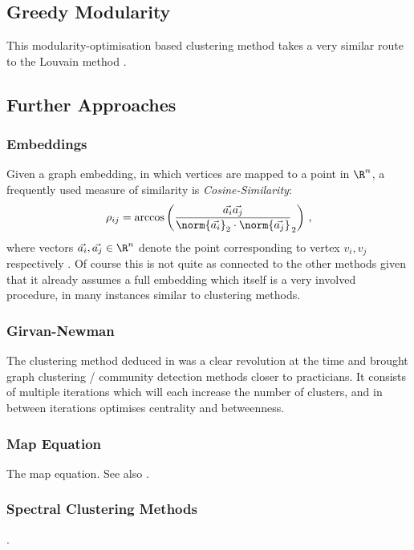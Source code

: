 \documentclass[12pt, a4paper]{article}
\begin{document}
  \subsection{Greedy Modularity}
  This modularity-optimisation based clustering method takes a very similar route to the Louvain method \cite{clauset-greedy-modularity}.

  \subsection{Further Approaches}
  \subsubsection{Embeddings}
  Given a graph embedding, in which vertices are mapped to a point in $\R^n$, a frequently used measure of similarity is \textit{Cosine-Similarity}:
  $$\rho_{ij} = \arccos\left(\frac{\vec{a_i} \vec{a_j}}{\norm{\vec{a_i}}_2 \cdot \norm{\vec{a_j}}}_2\right)\,,$$
  where vectors $\vec{a_i}, \vec{a_j} \in \R^n$ denote the point corresponding to vertex $v_i, v_j$ respectively \parencite{fortunato}.
  Of course this is not quite as connected to the other methods given that it already assumes a full embedding which itself is a very involved procedure, in many instances similar to clustering methods.

  \subsubsection{Girvan-Newman}
  The clustering method deduced in \cite{girvan-newman} was a clear revolution at the time and brought graph clustering / community detection methods closer to practicians.
  It consists of multiple iterations which will each increase the number of clusters, and in between iterations optimises centrality and betweenness.

  \subsubsection{Map Equation}
  \label{sec:mapequation}
  The map equation. See also .

  \subsubsection{Spectral Clustering Methods}
  \label{sec:spectral-clustering}
  \cite{fortunato}.
\end{document}
